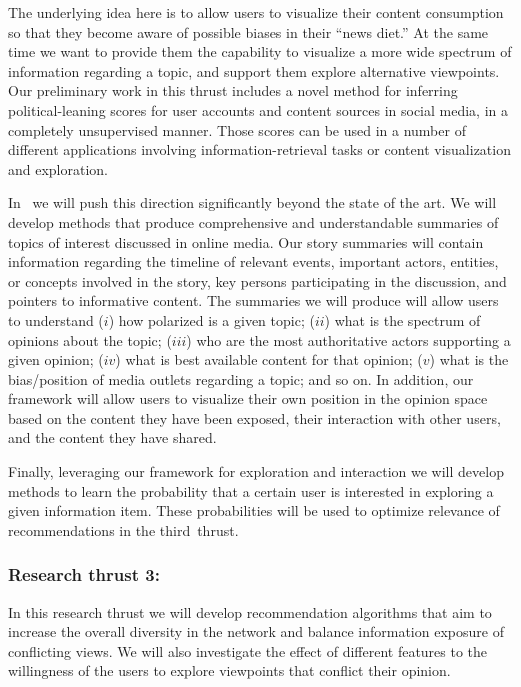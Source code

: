 \documentclass[a4paper,11pt]{article}
\begin{document}
\medskip
The underlying idea here is to allow users to visualize their content consumption
so that they become aware of possible biases in their ``news diet.'' 
At the same time we want to provide them the capability to visualize 
a more wide spectrum of information regarding a topic,
and support them explore alternative viewpoints.
Our preliminary work in this thrust
includes a novel method for inferring political-leaning scores
for user accounts and content sources in social media, 
in a completely unsupervised manner. %
Those scores can be used in a number of different applications
involving information-retrieval tasks or content visualization and exploration.

\smallskip
In \acronym\ we will push this direction significantly beyond the state of the art. 
We will develop methods that produce comprehensive and understandable summaries 
of topics of interest discussed in online media. 
Our story summaries will contain information regarding the timeline of relevant events, 
important actors, entities, or concepts involved in the story, 
key persons participating in the discussion, and 
pointers to informative content. 
The summaries we will produce will allow users to understand
($i$) how polarized is a given topic;
($ii$) what is the spectrum of opinions about the topic;
($iii$) who are the most authoritative actors supporting a given opinion; 
($iv$) what is best available content for that opinion;
($v$) what is the bias/position of media outlets regarding a topic; 
and so on. 
In addition, our framework will allow users to visualize their own position in the opinion space
based on the content they have been exposed, 
their interaction with other users, and the content they have shared.

\smallskip
Finally, leveraging our framework for exploration and interaction 
we will develop methods to learn the probability 
that a certain user is interested in exploring a given information item.
These probabilities will be used to optimize relevance of recommendations
in the third~thrust.


\subsubsection*{Research thrust 3: \recommend}

\noindent
\hspace{-3mm}\colorbox{verylightmagenta}{
\begin{minipage}{\textwidth}
In this research thrust we will 
develop recommendation algorithms that aim to increase the overall diversity in the network and 
balance information exposure of conflicting views. 
We will also investigate the effect of different features 
to the willingness of the users to explore viewpoints that conflict their opinion.
\end{minipage}}
\end{document}
